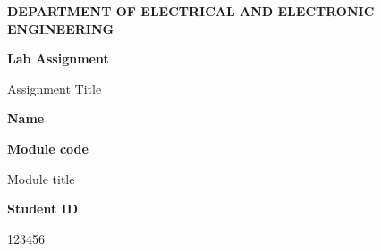 \documentclass[12pt,a4paper]{article}
\begin{document}
	\begin{titlepage}
		\begin{center}
			\bf{ \small{DEPARTMENT OF ELECTRICAL AND ELECTRONIC ENGINEERING} }
		\end{center}
		
		\vspace{4cm}
		\centering
		\textbf{\Huge Lab Assignment}
		
		\vspace{1cm}
		
		{\Large Assignment Title}
		
		\vspace{4cm}
		
		\textbf{\LARGE Name}
		
		\vspace{2cm}
		
		\textbf{\large Module code}
		
		\vspace{0.5cm}
		
		{\large Module title}
		
		\vspace{1.5cm}
		
		\textbf{\large Student ID}
		
		\vspace{0.5cm}
		
		{\large 123456}
		
		\vfill
		
	\end{titlepage}
	
	
	
\end{document}
